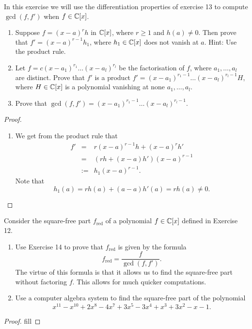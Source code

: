 \begin{exercise}{14}
In this exercise we will use the differentiation properties of exercise 13 to compute $\gcd(f,f')$ when $f\in\mathbb{C}[x]$.
\begin{enumerate}
    \item Suppose $f=(x-a)^rh$ in $\mathbb{C}[x]$, where $r\geq 1$ and $h(a)\neq 0$. Then prove that $f'=(x-a)^{r-1}h_1$, where $h_1\in\mathbb{C}[x]$ does not vanish at $a$. Hint: Use the product rule.
    \item Let $f=c(x-a_1)^{r_1}\dots(x-a_l)^{r_l}$ be the factorisation of $f$, where $a_1,\dots,a_l$ are distinct. Prove that $f'$ is a product $f'=(x-a_1)^{r_1-1}\dots(x-a_l)^{r_l-1}H$, where $H\in\mathbb{C}[x]$ is a polynomial vanishing at none $a_1,\dots,a_l$.
    \item Prove that $\gcd(f,f')=(x-a_1)^{r_1-1}\dots(x-a_l)^{r_l-1}$.
\end{enumerate}
\end{exercise}
\begin{proof}
\begin{enumerate}
    \item We get from the product rule that
    \begin{eqnarray*}
        f'
        & = & r(x-a)^{r-1} h + (x-a)^r h'\\
        & = & (rh + (x-a) h') (x-a)^{r-1}\\
        & := & h_1 (x-a)^{r-1}.
    \end{eqnarray*}
    Note that
    $$h_1(a) = rh(a) + (a-a)h'(a) = rh(a)\neq 0.$$
\end{enumerate}
\end{proof}

\begin{exercise}{15}
Consider the square-free part $f_{\text{red}}$ of a polynomial $f\in\mathbb{C}[x]$ defined in Exercise 12.
\begin{enumerate}
    \item Use Exercise 14 to prove that $f_{\text{red}}$ is given by the formula
    \[
    f_{\text{red}} =\frac{f}{\gcd(f,f')}.
    \]
    The virtue of this formula is that it allows us to find the square-free part without factoring $f$. This allows for much quicker computations.
    \item Use a computer algebra system to find the square-free part of the polynomial 
    \[
    x^11-x^10+2x^8-4x^7+3x^5-3x^4+x^3+3x^2-x-1.
    \]
\end{enumerate}
\end{exercise}
\begin{proof}
fill
\end{proof}

